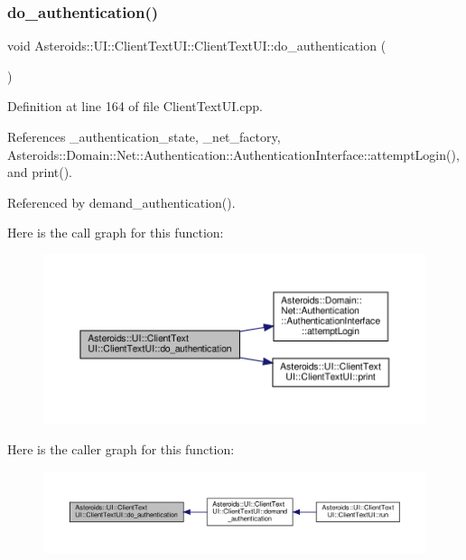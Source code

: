\subsubsection{\texorpdfstring{do\+\_\+authentication()}{do\_authentication()}}
{\footnotesize\ttfamily void Asteroids\+::\+U\+I\+::\+Client\+Text\+U\+I\+::\+Client\+Text\+U\+I\+::do\+\_\+authentication (\begin{DoxyParamCaption}{ }\end{DoxyParamCaption})\hspace{0.3cm}{\ttfamily [private]}}



Definition at line 164 of file Client\+Text\+U\+I.\+cpp.



References \+\_\+authentication\+\_\+state, \+\_\+net\+\_\+factory, Asteroids\+::\+Domain\+::\+Net\+::\+Authentication\+::\+Authentication\+Interface\+::attempt\+Login(), and print().



Referenced by demand\+\_\+authentication().

Here is the call graph for this function\+:\nopagebreak
\begin{figure}[H]
\begin{center}
\leavevmode
\includegraphics[width=350pt]{classAsteroids_1_1UI_1_1ClientTextUI_1_1ClientTextUI_a96251b4d6623fda575f39b84677b0ed5_cgraph}
\end{center}
\end{figure}
Here is the caller graph for this function\+:\nopagebreak
\begin{figure}[H]
\begin{center}
\leavevmode
\includegraphics[width=350pt]{classAsteroids_1_1UI_1_1ClientTextUI_1_1ClientTextUI_a96251b4d6623fda575f39b84677b0ed5_icgraph}
\end{center}
\end{figure}
\mbox{\label{classAsteroids_1_1UI_1_1ClientTextUI_1_1ClientTextUI_a6157c8167618db7195c35479096620ec}} 
